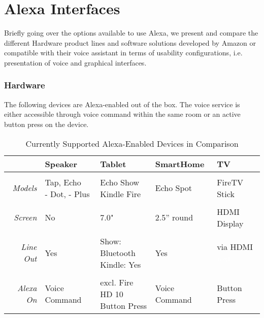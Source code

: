 
\section{Alexa Interfaces}

Briefly going over the options available to use Alexa, we present and compare the different Hardware product lines and software solutions developed by Amazon or compatible with their voice assistant in terms of usability configurations, i.e. presentation of voice and graphical interfaces.

\subsubsection*{Hardware}

The following devices are Alexa-enabled out of the box. The voice service is either accessible through voice command within the same room or an active button press on the device.

\begin{table}[htbp!]
	\caption[Alexa Devices in Comparision]{Currently Supported Alexa-Enabled Devices in Comparison}\label{alexaDeviceTable}
	\begin{tabularx}{\textwidth}{  r | l l l l  }
		
				& Speaker							& Tablet	& SmartHome	& TV	\\ \hline \hline \\
		\textit{Models}	& \shortstack[l]{Tap, Echo \\ - Dot, - Plus}     & \shortstack[l]{Echo Show \\ Kindle Fire}    & Echo Spot & FireTV Stick \\ \hline \\
		\textit{Screen}  		& No      & 7.0" 		& 2.5'' round				&  HDMI Display      \\ \hline \\
		\textit{Line Out}		& Yes      					        & \shortstack[l]{Show: Bluetooth \\ Kindle: Yes} & 	Yes & \shortstack{via HDMI \\ \textcolor{white}{text} }      \\ \hline \\
		\textit{Alexa On} 	& Voice	Command					&
		\shortstack{excl. Fire HD 10\\Button Press}
		& Voice Command & %
		Button Press
	\end{tabularx}
\end{table}


